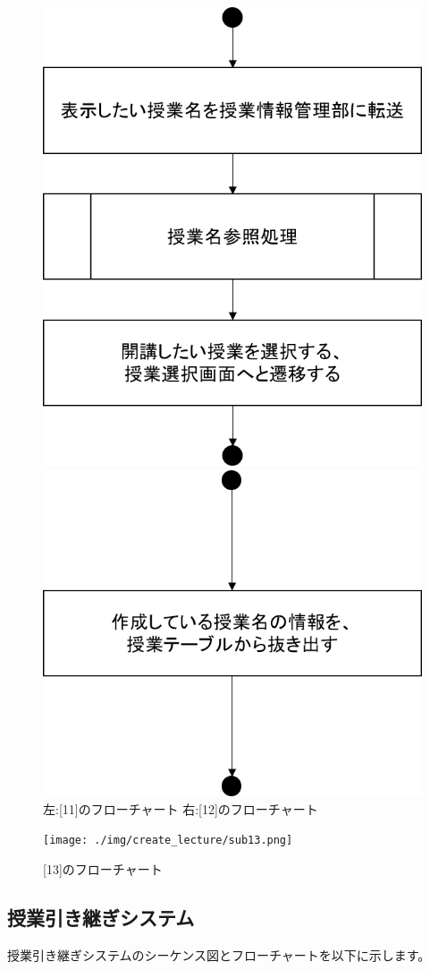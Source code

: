 \begin{figure}[htbp]
 \begin{minipage}{0.5\hsize}
  \begin{center}
   \includegraphics[width=0.5\linewidth,clip]{./img/create_lecture/sub11.png}
  \end{center}
 \end{minipage}
 \begin{minipage}{0.5\hsize}
  \begin{center}
   \includegraphics[width=0.5\linewidth,clip]{./img/create_lecture/sub12.png}
  \end{center}
 \end{minipage}
 \caption{左:[11]のフローチャート 右:[12]のフローチャート}\label{fig:createlectureflow5}
\end{figure}

\begin{figure}[htbp]
  \begin{center}
    \texttt{[image: ./img/create\_lecture/sub13.png]}
    \caption{[13]のフローチャート}\label{fig:createlectureflow6}
  \end{center}
\end{figure}
\newpage
\subsection{授業引き継ぎシステム}
授業引き継ぎシステムのシーケンス図とフローチャートを以下に示します。

